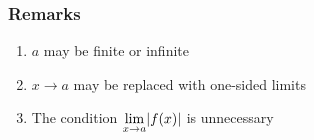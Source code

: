 \documentclass[../ma2002_notes.tex]{subfiles}
\begin{document}
\subsubsection{Remarks}
\begin{enumerate}
	\item\(a\) may be finite or infinite
	\item\(x\to a\) may be replaced with one-sided limits
	\item The condition \(\lim\limits_{x\to a}\lvert f(x)\rvert\) is unnecessary
\end{enumerate}
\end{document}
